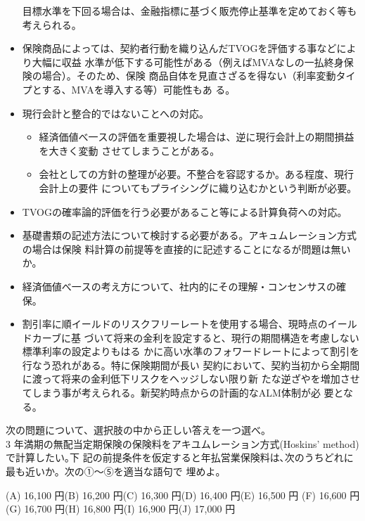 \documentclass[report,gutter=10mm,fore-edge=10mm,uplatex,dvipdfmx]{jlreq}
\begin{document}
\begin{itemize}
目標水準を下回る場合は、金融指標に基づく販売停止基準を定めておく等も考えられる。
 \item 保険商品によっては、契約者行動を織り込んだTVOGを評価する事などにより大幅に収益
水準が低下する可能性がある（例えばMVAなしの一払終身保険の場合）。そのため、保険
商品自体を見直さざるを得ない（利率変動タイプとする、MVAを導入する等）可能性もあ
る。
 \item 現行会計と整合的ではないことへの対応。
\begin{itemize}
 \item 経済価値べ一スの評価を重要視した場合は、逆に現行会計上の期間損益を大きく変動
させてしまうことがある。
 \item 会社としての方針の整理が必要。不整合を容認するか。ある程度、現行会計上の要件
についてもプライシングに織り込むかという判断が必要。
\end{itemize}
 \item TVOGの確率論的評価を行う必要があること等による計算負荷への対応。
 \item 基礎書類の記述方法について検討する必要がある。アキュムレーション方式の場合は保険
料計算の前提等を直接的に記述することになるが問題は無いか。
 \item 経済価値べ一スの考え方について、社内的にその理解・コンセンサスの確保。
 \item 割引率に順イールドのリスクフリーレートを使用する場合、現時点のイールドカーブに基
づいて将来の金利を設定すると、現行の期間構造を考慮しない標準利率の設定よりもはる
かに高い水準のフォワードレートによって割引を行なう恐れがある。特に保険期間が長い
契約において、契約当初から全期間に渡って将来の金利低下リスクをヘッジしない限り新
たな逆ざやを増加させてしまう事が考えられる。新契約時点からの計画的なALM体制が必
要となる。
\end{itemize}

次の問題について、選択肢の中から正しい答えを一つ選べ。\\
3 年満期の無配当定期保険の保険料をアキユムレーション方式(Hoskins' method)で計算したい｡下
記の前提条件を仮定すると年払営業保険料は､次のうちどれに最も近いか。次の①～⑤を適当な語句で
埋めよ。

(A) 16,100 円(B) 16,200 円(C) 16,300 円(D) 16,400 円(E) 16,500 円
(F) 16,600 円(G) 16,700 円(H) 16,800 円(I) 16,900 円(J) 17,000 円
\end{document}

